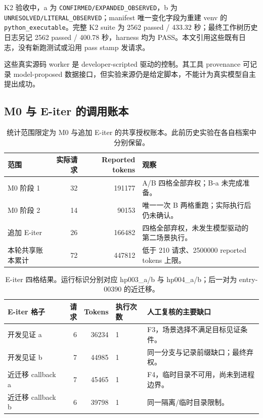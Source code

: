 \documentclass[UTF8,a4paper,zihao=-4,fontset=none]{ctexart}
\newcommand{\code}[1]{{\small\nolinkurl{#1}}}
\begin{document}
K2 验收中，a 为 \code{CONFIRMED/EXPANDED_OBSERVED}，b 为 \code{UNRESOLVED/LITERAL_OBSERVED}；manifest 唯一变化字段为重建 venv 的 \code{python_executable}。完整 K2 suite 为 2562 passed / 433.32 秒；最终工作树历史日志另记 2562 passed / 400.78 秒，harness 均为 PASS。本文引用这些既有日志，没有新跑测试或沿用 pass stamp 发请求。\cite{k2,final}

这些真实源码 worker 是 developer-scripted 驱动的控制。其工具 provenance 可记录 model-proposed 数据接口，但实验来源仍是给定脚本，不能计为真实模型自主提出成功。

\subsection{M0 与 E-iter 的调用账本}
\begin{table}[htbp]
\centering\small
\begin{tabularx}{\textwidth}{L{32mm}r r Y}
\toprule 范围 & 实际请求 & Reported tokens & 观察\\\midrule
M0 阶段 1 & 32 & 191177 & A/B 四格全部弃权；B-a 未完成准备。\\
M0 阶段 2 & 14 & 90153 & 唯一一次 B 两格重跑；实际执行后仍未确认。\\
追加 E-iter & 26 & 166482 & 四格全部弃权，未发生模型驱动的第二场景执行。\\
\midrule
本轮共享账本累计 & 72 & 447812 & 低于 210 请求、2500000 reported tokens 上限。\\
\bottomrule
\end{tabularx}
\caption{统计范围限定为 M0 与追加 E-iter 的共享授权账本。此前历史实验在各自档案中分别保留。}
\end{table}

\begin{table}[htbp]
\centering\small
\begin{tabularx}{\textwidth}{L{37mm}r r L{18mm}Y}
\toprule E-iter 格子 & 请求 & Tokens & 执行次数 & 人工复核的主要缺口\\\midrule
开发见证 a & 6 & 36234 & 1 & F3，场景选择不满足目标见证条件。\\
开发见证 b & 7 & 44985 & 1 & 同一分支与记录前缀缺口；最终弃权。\\
近迁移 callback a & 7 & 45465 & 1 & F4，临时目录不可用，尚未到进程边界。\\
近迁移 callback b & 6 & 39798 & 1 & 同一隔离/临时目录限制。\\
\bottomrule
\end{tabularx}
\caption{E-iter 四格结果。运行标识分别对应 hp003\_a/b 与 hp004\_a/b；后一对为 entry-00390 的近迁移。}
\end{table}
\end{document}

